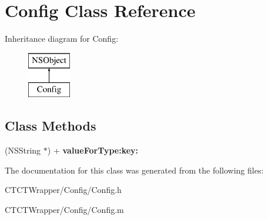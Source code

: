 \hypertarget{interface_config}{\section{Config Class Reference}
\label{interface_config}
}
Inheritance diagram for Config\-:\begin{figure}[H]
\begin{center}
\leavevmode
\includegraphics[height=2.000000cm]{interface_config}
\end{center}
\end{figure}
\subsection*{Class Methods}
\begin{DoxyCompactItemize}
\item 
\hypertarget{interface_config_a2530eb13c9d1a7cb6a0e2679019d1271}{(N\-S\-String $\ast$) + {\bfseries value\-For\-Type\-:key\-:}}\label{interface_config_a2530eb13c9d1a7cb6a0e2679019d1271}

\end{DoxyCompactItemize}


The documentation for this class was generated from the following files\-:\begin{DoxyCompactItemize}
\item 
C\-T\-C\-T\-Wrapper/\-Config/Config.\-h\item 
C\-T\-C\-T\-Wrapper/\-Config/Config.\-m\end{DoxyCompactItemize}

